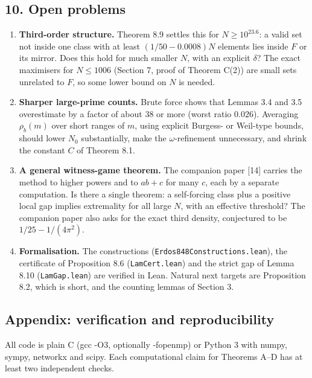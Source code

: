 \documentclass[
  11pt,
]{article}
\providecommand{\tightlist}{%
  \setlength{\itemsep}{0pt}\setlength{\parskip}{0pt}}
\begin{document}
\subsection{10. Open problems}

\begin{enumerate}
\def\labelenumi{\arabic{enumi}.}
\tightlist
\item
  \textbf{Third-order structure.} Theorem 8.9 settles this for
  \(N \ge 10^{23.6}\): a valid set not inside one class with at least
  \((1/50 - 0.0008)N\) elements lies inside \(F\) or its mirror. Does
  this hold for much smaller \(N\), with an explicit \(\delta\)? The
  exact maximisers for \(N \le 1006\) (Section 7, proof of Theorem C(2))
  are small sets unrelated to \(F\), so some lower bound on \(N\) is
  needed.
\item
  \textbf{Sharper large-prime counts.} Brute force shows that Lemmas 3.4
  and 3.5 overestimate by a factor of about 38 or more (worst ratio
  \(0.026\)). Averaging \(\rho_b(m)\) over short ranges of \(m\), using
  explicit Burgess- or Weil-type bounds, should lower \(N_0\)
  substantially, make the \(\omega\)-refinement unnecessary, and shrink
  the constant \(C\) of Theorem 8.1.
\item
  \textbf{A general witness-game theorem.} The companion paper {[}14{]}
  carries the method to higher powers and to \(ab + c\) for many \(c\),
  each by a separate computation. Is there a single theorem: a
  self-forcing class plus a positive local gap implies extremality for
  all large \(N\), with an effective threshold? The companion paper also
  asks for the exact third density, conjectured to be
  \(1/25 - 1/(4\pi^2)\).
\item
  \textbf{Formalisation.} The constructions
  (\texttt{Erdos848Constructions.lean}), the certificate of Proposition
  8.6 (\texttt{LamCert.lean}) and the strict gap of Lemma 8.10
  (\texttt{LamGap.lean}) are verified in Lean. Natural next targets are
  Proposition 8.2, which is short, and the counting lemmas of Section 3.
\end{enumerate}

\subsection{Appendix: verification and reproducibility}

All code is plain C (gcc -O3, optionally -fopenmp) or Python 3 with
numpy, sympy, networkx and scipy. Each computational claim for Theorems
A--D has at least two independent checks.
\end{document}
